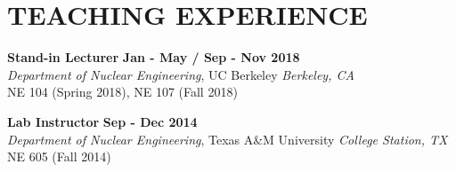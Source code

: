 \section{\small{TEACHING EXPERIENCE}}

\textbf{Stand-in Lecturer} \hfill \textbf{Jan - May / Sep - Nov 2018} \\
\textsl{Department of Nuclear Engineering}, UC Berkeley \hfill \textsl{Berkeley, CA}\\
{\small NE 104 (Spring 2018), NE 107 (Fall 2018)}\\[-2.8ex]
\vspace{-5pt}

\textbf{Lab Instructor} \hfill \textbf{Sep - Dec 2014} \\
\textsl{Department of Nuclear Engineering}, Texas A\&M University \hfill \textsl{College Station, TX}\\
{\small NE 605 (Fall 2014)}\\[-2.8ex]

